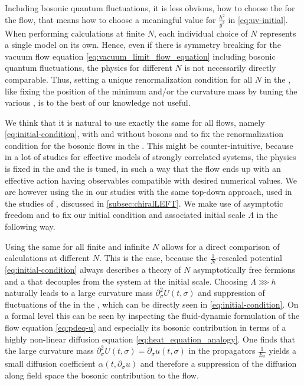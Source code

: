 Including bosonic quantum fluctuations, it is less obvious, how to choose the \ic{} for the \frg{} flow, that means how to choose a meaningful value for $\frac{h^2}{g^2}$ in \cref{eq:uv-initial}. When performing calculations at finite $N$, each individual choice of $N$ represents a single model on its own. 
Hence, even if there is symmetry breaking for the vacuum flow equation \eqref{eq:vacuum_limit_flow_equation} including bosonic quantum fluctuations, the \ir{} physics for different $N$ is not necessarily directly comparable.
Thus, setting a unique renormalization condition for all $N$ in the \ir{}, like fixing the position of the \ir{} minimum and/or the \ir{} curvature mass by tuning the various \uv{} \ics{}, is \dash{} to the best of our knowledge \dash{} not useful.

We think that it is natural to use exactly the same \ic{} for all \frg{} flows, namely \cref{eq:initial-condition}, with and without bosons and to fix the renormalization condition for the bosonic \frg{} flows in the \uv{}.
This might be counter-intuitive, because in a lot of \frg{} studies for effective models of strongly correlated systems, the physics is fixed in the \ir{} and the \uv{} \ic{} is tuned, in such a way that the \frg{} flow ends up with an \ir{} effective action having observables compatible with desired numerical values. 
We are however using the \gnm{} in our studies with the same top-down approach, used in the \frg{} studies of \qcd{}, discussed in \cref{subsec:chiralLEFT}.
We make use of asymptotic freedom and \rgcy{} to fix our initial condition and associated \uv{} initial scale $\Lambda$ in the following way.\bigskip

Using the same \uv{} \ic{} for all finite and infinite $N$ allows for a direct comparison of calculations at different $N$.
This is the case, because the $\tfrac{1}{N}$-rescaled \uv{} potential \eqref{eq:initial-condition} always describes a theory of $N$ asymptotically free fermions and a \sigmaMode{} that decouples from the system at the \uv{} initial scale.
Choosing $\Lambda \ggg h$ naturally leads to a large curvature mass $\partial_\sigma^2 U ( t, \sigma )$ and suppression of fluctuations of the \sigmaMode{} in the \uv{}, which can be directly seen in \cref{eq:initial-condition}.
On a formal level this can be seen by inspecting the fluid-dynamic formulation of the \frg{} flow equation \eqref{eq:pdeq-u} and especially its bosonic contribution in terms of a highly non-linear diffusion equation \eqref{eq:heat_equation_analogy}. One finds that the large curvature mass $\partial_\sigma^2 U ( t, \sigma )= \partial_\sigma u ( t, \sigma )$ in the propagators $\tfrac{1}{E_\sigma}$ yields a small diffusion coefficient $\alpha ( t, \partial_\sigma u )$ and therefore a suppression of the diffusion along field space \dash{} the bosonic contribution to the \frg{} flow.

